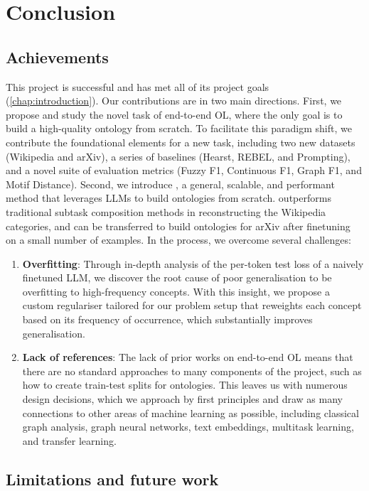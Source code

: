 \chapter{Conclusion}

\section{Achievements}

This project is successful and has met all of its project goals (\cref{chap:introduction}). Our contributions are in two main directions. First, we propose and study the novel task of end-to-end OL, where the only goal is to build a high-quality ontology from scratch. To facilitate this paradigm shift, we contribute the foundational elements for a new task, including two new datasets (Wikipedia and arXiv), a series of baselines (Hearst, REBEL, and Prompting), and a novel suite of evaluation metrics (Fuzzy F1, Continuous F1, Graph F1, and Motif Distance). Second, we introduce \name, a general, scalable, and performant method that leverages LLMs to build ontologies from scratch. \name outperforms traditional subtask composition methods in reconstructing the Wikipedia categories, and can be transferred to build ontologies for arXiv after finetuning on a small number of examples. In the process, we overcome several challenges:
\begin{enumerate}
    \item \textbf{Overfitting}: Through in-depth analysis of the per-token test loss of a naively finetuned LLM, we discover the root cause of poor generalisation to be overfitting to high-frequency concepts. With this insight, we propose a custom regulariser tailored for our problem setup that reweights each concept based on its frequency of occurrence, which substantially improves generalisation.
    \item \textbf{Lack of references}: The lack of prior works on end-to-end OL means that there are no standard approaches to many components of the project, such as how to create train-test splits for ontologies. This leaves us with numerous design decisions, which we approach by first principles and draw as many connections to other areas of machine learning as possible, including classical graph analysis, graph neural networks, text embeddings, multitask learning, and transfer learning.
\end{enumerate}


\section{Limitations and future work}

